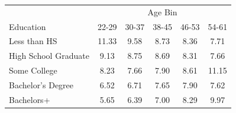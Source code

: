 \begin{tabular}{lccccc}
\hline\hline
 & \multicolumn{5}{c}{Age Bin} \\
Education & 22-29 & 30-37 & 38-45 & 46-53 & 54-61 \\
\hline
Less than HS&11.33&9.58&8.73&8.36&7.71\\
High School Graduate&9.13&8.75&8.69&8.31&7.66\\
Some College&8.23&7.66&7.90&8.61&11.15\\
Bachelor's Degree&6.52&6.71&7.65&7.90&7.62\\
Bachelors+&5.65&6.39&7.00&8.29&9.97\\
\hline\hline
\end{tabular}
